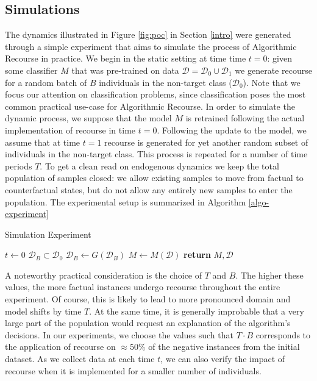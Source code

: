 \documentclass[conference,final,]{IEEEtran}
\begin{document}
\hypertarget{method-2-experiment}{%
\subsection{Simulations}\label{method-2-experiment}}

The dynamics illustrated in Figure \ref{fig:poc} in Section \ref{intro} were generated through a simple experiment that aims to simulate the process of Algorithmic Recourse in practice. We begin in the static setting at time time \(t=0\): given some classifier \(M\) that was pre-trained on data \(\mathcal{D}=\mathcal{D}_0 \cup \mathcal{D}_1\) we generate recourse for a random batch of \(B\) individuals in the non-target class (\(\mathcal{D}_0\)). Note that we focus our attention on classification problems, since classification poses the most common practical use-case for Algorithmic Recourse. In order to simulate the dynamic process, we suppose that the model \(M\) is retrained following the actual implementation of recourse in time \(t=0\). Following the update to the model, we assume that at time \(t=1\) recourse is generated for yet another random subset of individuals in the non-target class. This process is repeated for a number of time periods \(T\). To get a clean read on endogenous dynamics we keep the total population of samples closed: we allow existing samples to move from factual to counterfactual states, but do not allow any entirely new samples to enter the population. The experimental setup is summarized in Algorithm \ref{algo-experiment}

\begin{algorithm}
\caption{Simulation Experiment}\label{algo-experiment}
\begin{algorithmic}[1]
\State $t\gets 0$
\State $\mathcal{D}_B \subset \mathcal{D}_0$ 
\State $\mathcal{D}_B\gets G(\mathcal{D}_B)$ 
\State $M\gets M(\mathcal{D})$ 
\EndWhile
\State \textbf{return} $M,\mathcal{D}$
\EndProcedure
\end{algorithmic}
\end{algorithm}

A noteworthy practical consideration is the choice of \(T\) and \(B\). The higher these values, the more factual instances undergo recourse throughout the entire experiment. Of course, this is likely to lead to more pronounced domain and model shifts by time \(T\). At the same time, it is generally improbable that a very large part of the population would request an explanation of the algorithm's decisions. In our experiments, we choose the values such that \(T \cdot B\) corresponds to the application of recourse on \(\approx50\%\) of the negative instances from the initial dataset. As we collect data at each time \(t\), we can also verify the impact of recourse when it is implemented for a smaller number of individuals.
\end{document}
